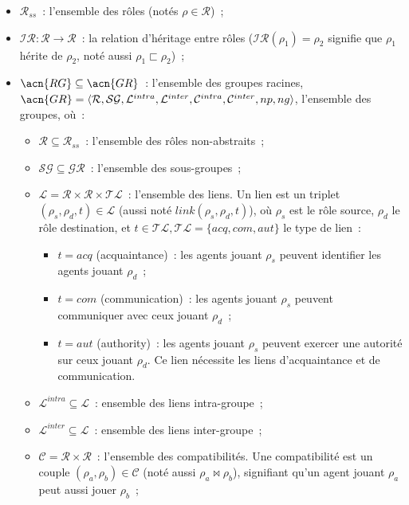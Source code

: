 \begin{itemize}
    \item $\mathcal{R}_{ss}$~: l'ensemble des rôles (notés $\rho \in \mathcal{R}$)~;
    \item $\mathcal{IR}: \mathcal{R} \rightarrow \mathcal{R}$~: la relation d'héritage entre rôles ($\mathcal{IR}(\rho_1) = \rho_2$ signifie que $\rho_1$ hérite de $\rho_2$, noté aussi $\rho_1 \sqsubset \rho_2$)~;
    \item $\acn{RG} \subseteq \acn{GR}$~: l'ensemble des groupes racines, $\acn{GR} = \langle \mathcal{R}, \mathcal{SG}, \mathcal{L}^{intra}, \mathcal{L}^{inter}, \mathcal{C}^{intra}, \mathcal{C}^{inter}, np, ng \rangle$, l'ensemble des groupes, où~:
          \begin{itemize}
              \item $\mathcal{R} \subseteq \mathcal{R}_{ss}$~: l'ensemble des rôles non-abstraits~;
              \item $\mathcal{SG} \subseteq \mathcal{GR}$~: l'ensemble des sous-groupes~;
              \item $\mathcal{L} = \mathcal{R} \times \mathcal{R} \times \mathcal{TL}$~: l'ensemble des liens. Un lien est un triplet $(\rho_s,\rho_d,t) \in \mathcal{L}$ (aussi noté $link(\rho_s,\rho_d,t)$), où $\rho_s$ est le rôle source, $\rho_d$ le rôle destination, et $t \in \mathcal{TL}, \mathcal{TL} = \{acq, com, aut\}$ le type de lien~:
                    \begin{itemize}
                        \item $t = acq$ (acquaintance)~: les agents jouant $\rho_s$ peuvent identifier les agents jouant $\rho_d$~;
                        \item $t = com$ (communication)~: les agents jouant $\rho_s$ peuvent communiquer avec ceux jouant $\rho_d$~;
                        \item $t = aut$ (authority)~: les agents jouant $\rho_s$ peuvent exercer une autorité sur ceux jouant $\rho_d$. Ce lien nécessite les liens d'acquaintance et de communication.
                    \end{itemize}
              \item $\mathcal{L}^{intra} \subseteq \mathcal{L}$~: ensemble des liens intra-groupe~;
              \item $\mathcal{L}^{inter} \subseteq \mathcal{L}$~: ensemble des liens inter-groupe~;
              \item $\mathcal{C} = \mathcal{R} \times \mathcal{R}$~: l'ensemble des compatibilités. Une compatibilité est un couple $(\rho_a, \rho_b) \in \mathcal{C}$ (noté aussi $\rho_a \bowtie \rho_b$), signifiant qu'un agent jouant $\rho_a$ peut aussi jouer $\rho_b$~;

\end{itemize}
\end{itemize}
